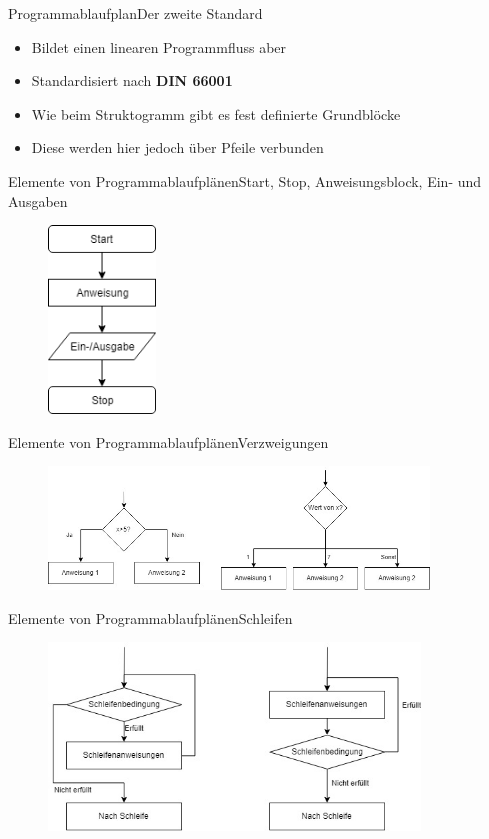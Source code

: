 \begin{frame}{Programmablaufplan}{Der zweite Standard}
    \begin{itemize}
        \item Bildet einen linearen Programmfluss aber
        \item Standardisiert nach \textbf{DIN 66001}
        \item Wie beim Struktogramm gibt es fest definierte Grundblöcke
        \item Diese werden hier jedoch über Pfeile verbunden
    \end{itemize}
\end{frame}

\begin{frame}{Elemente von Programmablaufplänen}{Start, Stop, Anweisungsblock, Ein- und Ausgaben}
\begin{figure}
    \includegraphics[height=5cm]{graph/pap_basics}
\end{figure}
\end{frame}

\begin{frame}{Elemente von Programmablaufplänen}{Verzweigungen}
\begin{figure}
    \includegraphics[width=0.9\textwidth]{graph/pap_decision}
\end{figure}
\end{frame}



\begin{frame}{Elemente von Programmablaufplänen}{Schleifen}
\begin{figure}
    \includegraphics[height=5cm]{graph/pap_loops}
\end{figure}
\end{frame}

